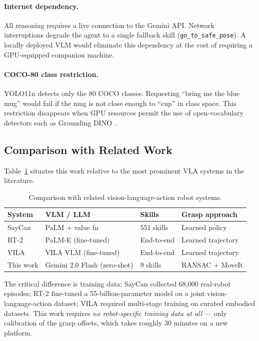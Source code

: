 \paragraph{Internet dependency.}
All reasoning requires a live connection to the Gemini API.
Network interruptions degrade the agent to a single fallback skill (\texttt{go\_to\_safe\_pose}).
A locally deployed VLM would eliminate this dependency at the cost of requiring a
GPU-equipped companion machine.

\paragraph{COCO-80 class restriction.}
YOLO11n detects only the 80 COCO classes.
Requesting ``bring me the blue mug'' would fail if the mug is not close enough to
``cup'' in class space.
This restriction disappears when GPU resources permit the use of open-vocabulary detectors
such as Grounding DINO~\cite{liu2023gdino}.

\subsection{Comparison with Related Work}

Table~\ref{tab:related_comparison} situates this work relative to the most prominent
VLA systems in the literature.

\begin{table}[H]
\centering
\caption{Comparison with related vision-language-action robot systems.}
\label{tab:related_comparison}
\begin{tabularx}{\linewidth}{lXXX}
\toprule
\textbf{System} & \textbf{VLM / LLM} & \textbf{Skills} & \textbf{Grasp approach} \\
\midrule
SayCan \cite{ahn2022saycan}   & PaLM + value fn  & 551 skills & Learned policy \\
RT-2 \cite{brohan2023rt2}     & PaLM-E (fine-tuned) & End-to-end & Learned trajectory \\
VILA \cite{lin2024vila}        & VILA VLM (fine-tuned) & End-to-end & Learned trajectory \\
This work                      & Gemini 2.0 Flash (zero-shot) & 9 skills & RANSAC + MoveIt \\
\bottomrule
\end{tabularx}
\end{table}

The critical difference is training data: SayCan collected 68,000 real-robot episodes;
RT-2 fine-tuned a 55-billion-parameter model on a joint vision-language-action dataset;
VILA required multi-stage training on curated embodied datasets.
This work requires \emph{no robot-specific training data at all} --- only calibration
of the grasp offsets, which takes roughly 30 minutes on a new platform.

